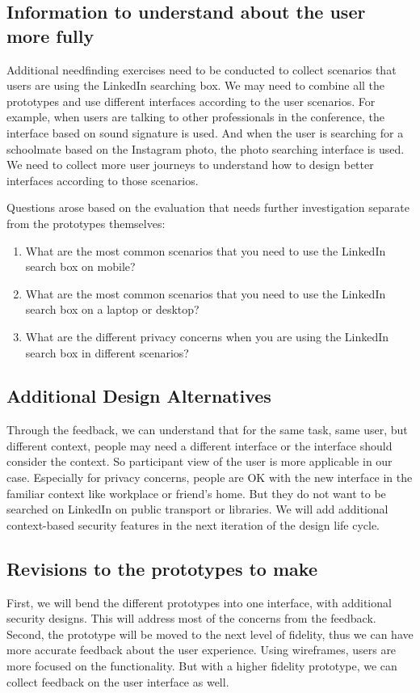 \documentclass[
	letterpaper, %
]{jdf}
\begin{document}
\subsection{Information to understand about the user more fully}
Additional needfinding exercises need to be conducted to collect scenarios that users are using the LinkedIn searching box. We may need to combine all the prototypes and use different interfaces according to the user scenarios. For example, when users are talking to other professionals in the conference, the interface based on sound signature is used. And when the user is searching for a schoolmate based on the Instagram photo, the photo searching interface is used. We need to collect more user journeys to understand how to design better interfaces according to those scenarios.

Questions arose based on the evaluation that needs further investigation separate from the prototypes themselves:
\begin{enumerate}
    \item What are the most common scenarios that you need to use the LinkedIn search box on mobile?
    \item What are the most common scenarios that you need to use the LinkedIn search box on a laptop or desktop?
    \item What are the different privacy concerns when you are using the LinkedIn search box in different scenarios?
\end{enumerate}

\subsection{Additional Design Alternatives}
Through the feedback, we can understand that for the same task, same user, but different context, people may need a different interface or the interface should consider the context. So participant view of the user is more applicable in our case. Especially for privacy concerns, people are OK with the new interface in the familiar context like workplace or friend's home. But they do not want to be searched on LinkedIn on public transport or libraries. We will add additional context-based security features in the next iteration of the design life cycle.

\subsection{Revisions to the prototypes to make}
First, we will bend the different prototypes into one interface, with additional security designs. This will address most of the concerns from the feedback. Second, the prototype will be moved to the next level of fidelity, thus we can have more accurate feedback about the user experience. Using wireframes, users are more focused on the functionality. But with a higher fidelity prototype, we can collect feedback on the user interface as well.
\end{document}
